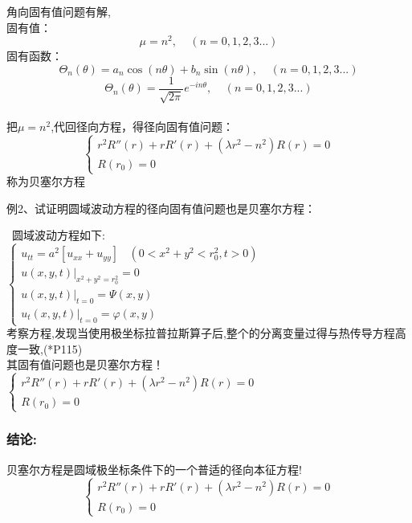 \begin{frame}
	角向固有值问题有解,\\
	固有值：
	\begin{equation*}
		\mu=n^2, ~~~~~(n=0,1,2,3...)
	\end{equation*}
	固有函数：
	\begin{equation*}
		\Theta_n(\theta) = a_n \cos(n\theta)+b_n \sin(n\theta), ~~~~~(n=0,1,2,3...)
	\end{equation*}
	\begin{equation*}
		\Theta_n(\theta) = \frac{1}{\sqrt{2\pi}} e^{-i n \theta }, ~~~~~(n=0,1,2,3...)
	\end{equation*}
	~\\
	把$\mu=n^2$,代回径向方程，得径向固有值问题：\vspace{0.6em}
	\[ \boxed{ \begin{cases}
		r^2 R'' (r)+r R'(r) +( \lambda r^2 -n^2)R(r)=0  \\
		R(r_0)=0
	\end{cases} }\]	
	称为贝塞尔方程	
\end{frame}	

\begin{frame}
	\begin{exampleblock} {例2、试证明圆域波动方程的径向固有值问题也是贝塞尔方程：}~ ~
	\end{exampleblock}
	\证~圆域波动方程如下:\\
	$\begin{cases}
		u_{tt}=a^2 [u_{xx}   +u_{yy}] ~~~~ (0< x^2 +y^2 <r_0 ^2, t>0)\\
		u(x,y,t)|_{x^2+y^2=r_0 ^2}= 0 \\
		u(x,y,t)|_{t=0}= \Psi(x,y) \\
		u_t (x,y,t)|_{t=0}= \varphi  (x,y) 
	\end{cases} $\\	\vspace{0.6em}
	考察方程,发现当使用极坐标拉普拉斯算子后,整个的分离变量过得与热传导方程高度一致,(*P115)\\
	其固有值问题也是贝塞尔方程！\\ \vspace{0.6em}
	$\begin{cases}
		r^2 R'' (r)+r R'(r) +( \lambda r^2 -n^2)R(r)=0  \\
		R(r_0)=0
	\end{cases} $\\		
\end{frame}	

\begin{frame}
	\frametitle{结论: }
	贝塞尔方程是圆域极坐标条件下的一个普适的径向本征方程! \\ \vspace{2em}
	\[\begin{cases}
		r^2 R'' (r)+r R'(r) +( \lambda r^2 -n^2)R(r)=0  \\
		R(r_0)=0
	\end{cases}  \]\\	
\end{frame}	

